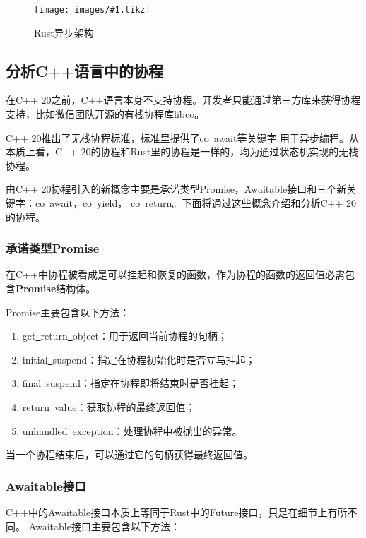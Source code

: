 \documentclass[supercite]{HustGraduPaper}
\newcommand{\cfig}[3]{
  \begin{figure}[htb]
    \centering
    \texttt{[image: images/\#1.tikz]}
    \caption{#3}
    \label{fig:#1}
  \end{figure}
}
\theoremstyle{definition}
\begin{document}
\cfig{rust-async}{0.9}{Rust异步架构}

\subsection{分析C++语言中的协程}
在C++ 20之前，C++语言本身不支持协程。开发者只能通过第三方库来获得协程支持，比如微信团队开源的有栈协程库libco。\par

C++ 20推出了无栈协程标准，标准里提供了co\underline{~}await等关键字
用于异步编程。从本质上看，C++ 20的协程和Rust里的协程是一样的，均为通过状态机实现的无栈协程。\par

由C++ 20协程引入的新概念主要是承诺类型Promise，Awaitable接口和三个新关键字：co\underline{~}await，co\underline{~}yield，
co\underline{~}return。下面将通过这些概念介绍和分析C++ 20的协程。\par

\subsubsection{承诺类型Promise}

在C++中协程被看成是可以挂起和恢复的函数，作为协程的函数的返回值必需包含\textbf{Promise}结构体。\par

Promise主要包含以下方法：

\begin{enumerate}[label={(\arabic*)}]
  \item get\underline{~}return\underline{~}object：用于返回当前协程的句柄；
  \item initial\underline{~}suspend：指定在协程初始化时是否立马挂起；
  \item final\underline{~}suspend：指定在协程即将结束时是否挂起；
  \item return\underline{~}value：获取协程的最终返回值；
  \item unhandled\underline{~}exception：处理协程中被抛出的异常。
\end{enumerate}

当一个协程结束后，可以通过它的句柄获得最终返回值。\par

\subsubsection{Awaitable接口}

C++中的Awaitable接口本质上等同于Rust中的Future接口，只是在细节上有所不同。
Awaitable接口主要包含以下方法：
\end{document}
